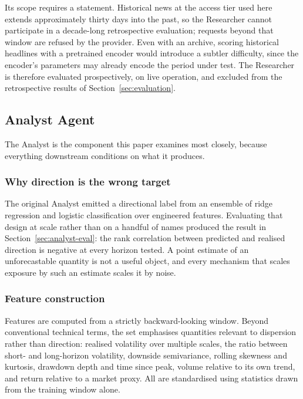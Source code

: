 \documentclass[conference]{IEEEtran}
\begin{document}
Its scope requires a statement. Historical news at the access tier used here
extends approximately thirty days into the past, so the Researcher cannot
participate in a decade-long retrospective evaluation; requests beyond that
window are refused by the provider. Even with an archive, scoring historical
headlines with a pretrained encoder would introduce a subtler difficulty,
since the encoder's parameters may already encode the period under test. The
Researcher is therefore evaluated prospectively, on live operation, and
excluded from the retrospective results of Section~\ref{sec:evaluation}.

\subsection{Analyst Agent}
\label{sec:analyst}
The Analyst is the component this paper examines most closely, because
everything downstream conditions on what it produces.

\subsubsection{Why direction is the wrong target}
The original Analyst emitted a directional label from an ensemble of ridge
regression and logistic classification over engineered features. Evaluating
that design at scale rather than on a handful of names produced the result in
Section~\ref{sec:analyst-eval}: the rank correlation between predicted and
realised direction is negative at every horizon tested. A point estimate of
an unforecastable quantity is not a useful object, and every mechanism that
scales exposure by such an estimate scales it by noise.

\subsubsection{Feature construction}
Features are computed from a strictly backward-looking window. Beyond
conventional technical terms, the set emphasises quantities relevant to
dispersion rather than direction: realised volatility over multiple scales,
the ratio between short- and long-horizon volatility, downside semivariance,
rolling skewness and kurtosis, drawdown depth and time since peak, volume
relative to its own trend, and return relative to a market proxy. All are
standardised using statistics drawn from the training window alone.
\end{document}
